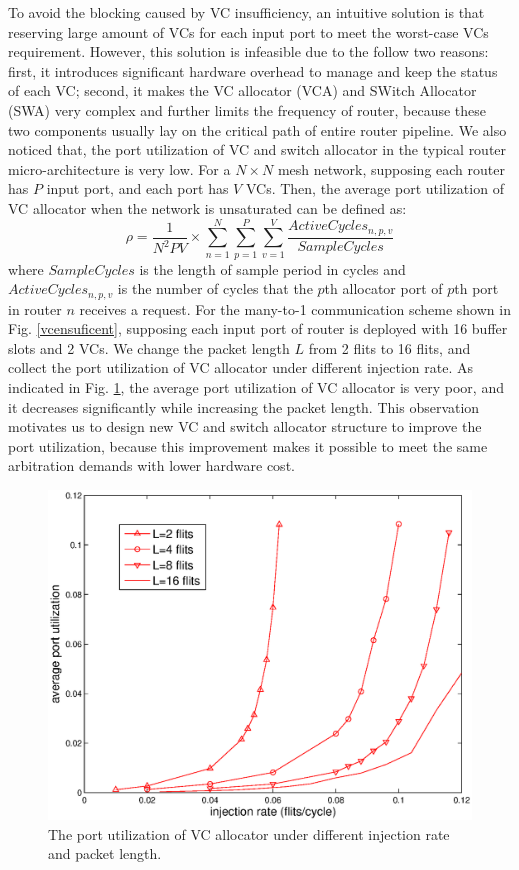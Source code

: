 \documentclass[10pt,conference]{IEEEtran}
\begin{document}
To avoid the blocking caused by VC insufficiency, an intuitive solution is that reserving large amount of VCs for each input port to meet the worst-case VCs requirement. However, this solution is infeasible due to the follow two reasons: first, it introduces significant hardware overhead to manage and keep the status of each VC; second, it makes the VC allocator (VCA) and SWitch Allocator (SWA) very complex and further limits the frequency of router, because these two components usually lay on the critical path of entire router pipeline. We also noticed that, the port utilization of VC and switch allocator in the typical router micro-architecture is very low. For a $N\times N$ mesh network, supposing each router has $P$ input port, and each port has $V$ VCs. Then, the average port utilization of VC allocator when the network is unsaturated can be defined as:
$$\rho=\frac{1}{N^2PV}\times \sum_{n=1}^N\sum_{p=1}^P\sum_{v=1}^V\frac{ActiveCycles_{n,p,v}}{SampleCycles}$$
where $SampleCycles$ is the length of sample period in cycles and $ActiveCycles_{n,p,v}$ is the number of cycles that the $p$th allocator port of $p$th port in router $n$ receives a request. For the many-to-1 communication scheme shown in Fig. \ref{vcensuficent}, supposing each input port of router is deployed with 16 buffer slots and 2 VCs. We change the packet length $L$ from 2 flits to 16 flits, and collect the port utilization of VC allocator under different injection rate. As indicated in Fig. \ref{utilization}, the average port utilization of VC allocator is very poor, and it decreases significantly while increasing the packet length. This observation motivates us to design new VC and switch allocator structure to improve the port utilization, because this improvement makes it possible to meet the same arbitration demands with lower hardware cost.
\begin{figure}
\centering\includegraphics[scale=0.5]{figures/util.eps}
\caption{The port utilization of VC allocator under different injection rate and packet length.}\label{utilization}
\end{figure}
\end{document}
